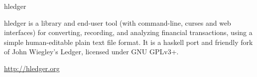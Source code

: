 \begin{hcarentry}[updated]{hledger}
\label{hledger}
\makeheader

hledger is a library and end-user tool (with command-line, curses and web
interfaces) for converting, recording, and analyzing financial
transactions, using a simple human-editable plain text file format. It is
a haskell port and friendly fork of John Wiegley's Ledger, licensed under
GNU GPLv3+.








\FurtherReading
  \url{http://hledger.org}
\end{hcarentry}
